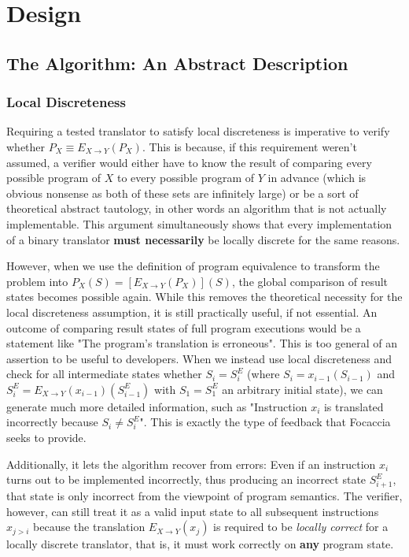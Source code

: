 \chapter{Design}\label{chapter:design}

\section{The Algorithm: An Abstract Description}\label{sec:abstract_algo}

\subsection{Local Discreteness}\label{sec:local_discreteness}

Requiring a tested translator to satisfy local discreteness is imperative to verify whether $P_X \equiv E_{X \rightarrow
Y}(P_X)$. This is because, if this requirement weren't assumed, a verifier would either have to know the result of
comparing every possible program of $X$ to every possible program of $Y$ in advance (which is obvious nonsense as both
of these sets are infinitely large) or be a sort of theoretical abstract tautology, in other words an algorithm that is
not actually implementable. This argument simultaneously shows that every implementation of a binary translator
\textbf{must necessarily} be locally discrete for the same reasons.

However, when we use the definition of program equivalence to transform the problem into $P_X(S) = [E_{X \rightarrow
Y}(P_X)](S)$, the global comparison of result states becomes possible again. While this removes the theoretical
necessity for the local discreteness assumption, it is still practically useful, if not essential. An outcome of
comparing result states of full program executions would be a statement like "The program's translation is erroneous".
This is too general of an assertion to be useful to developers. When we instead use local discreteness and check for all
intermediate states whether $S_i = S^E_i$ (where $S_i = x_{i-1}(S_{i-1})$ and $S^E_i = E_{X \rightarrow
Y}(x_{i-1})(S^E_{i-1})$ with $S_1 = S^E_1$ an arbitrary initial state), we can generate much more detailed information,
such as "Instruction $x_i$ is translated incorrectly because $S_i \neq S^E_i$". This is exactly the type of feedback
that Focaccia seeks to provide.

Additionally, it lets the algorithm recover from errors: Even if an instruction $x_i$ turns out to be implemented
incorrectly, thus producing an incorrect state $S^E_{i+1}$, that state is only incorrect from the viewpoint of program
semantics. The verifier, however, can still treat it as a valid input state to all subsequent instructions $x_{j > i}$
because the translation $E_{X \rightarrow Y}(x_j)$ is required to be \textit{locally correct} for a locally discrete
translator, that is, it must work correctly on \textbf{any} program state.

